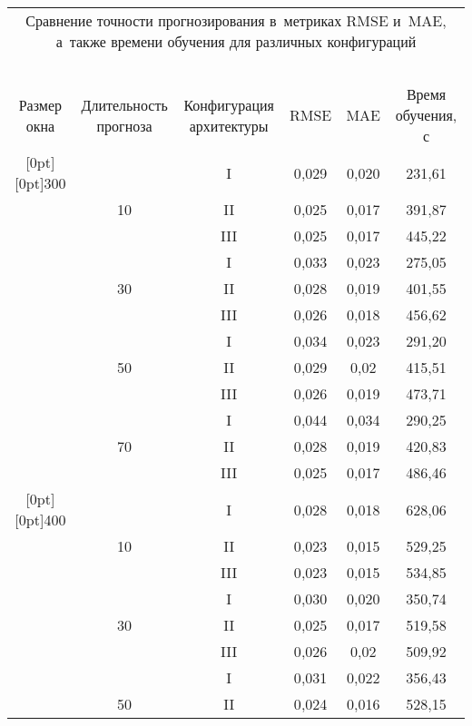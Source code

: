 \begin{table*}\small 
\begin{center}

\begin{tabular}{|c|c|c|c|c|c|}
\multicolumn{6}{p{158mm}}{Сравнение точности прогнозирования в~метриках RMSE и~MAE, 
а~также времени обучения для различных конфигураций}\\
\multicolumn{6}{c}{\ }\\[-6pt]
\hline
{Размер окна}&{Длительность прогноза}&{Конфигурация архитектуры}&
{RMSE}&{MAE}&{Время обучения, с}\\
\hline
\multicolumn{1}{|c|}{\raisebox{-60pt}[0pt][0pt]{300}} &  &I& 0{,}029 & 0{,}020 & 231{,}61 \\
&10&II& 0{,}025 & 0{,}017 & 391{,}87 \\
&&III& 0{,}025 & 0{,}017 & 445{,}22 \\
\cline{2-6}
& &I& 0{,}033 & 0{,}023 & 275{,}05 \\
&30&II& 0{,}028 & 0{,}019 & 401{,}55 \\
&&III& 0{,}026 & 0{,}018 & 456{,}62 \\
\cline{2-6}
&&I& 0{,}034 & 0{,}023 & 291{,}20 \\
&50 &II& 0{,}029 & 0{,}02 & 415{,}51 \\
&&III& 0{,}026 & 0{,}019 & 473{,}71 \\
\cline{2-6}
&  &I& 0{,}044 & 0{,}034 & 290{,}25 \\
&70&II& 0{,}028 & 0{,}019 & 420{,}83 \\
&&III& 0{,}025 & 0{,}017 & 486{,}46 \\
\hline
\multicolumn{1}{|c|}{\raisebox{-60pt}[0pt][0pt]{400}} & &I& 0{,}028 & 0{,}018 & 628{,}06 \\
&10&II& 0{,}023 & 0{,}015 & 529{,}25 \\
&&III& 0{,}023 & 0{,}015 & 534{,}85 \\
\cline{2-6}
& &I& 0{,}030 & 0{,}020 & 350{,}74 \\
&30&II& 0{,}025 & 0{,}017 & 519{,}58 \\
&&III& 0{,}026 & 0{,}02 & 509{,}92 \\
\cline{2-6}
& &I& 0{,}031 & 0{,}022 & 356{,}43 \\
&50&II& 0{,}024 & 0{,}016 & 528{,}15 \\

\end{tabular}
\end{center}
\end{table*}
